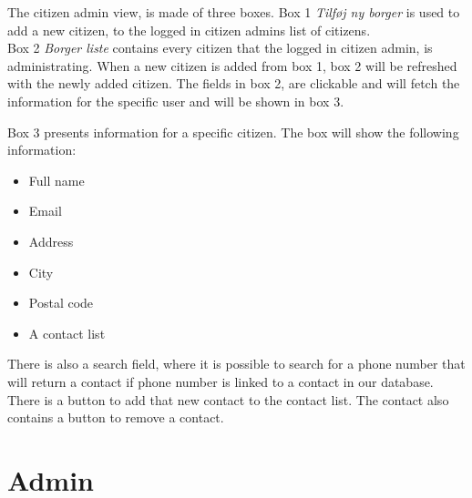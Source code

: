 The citizen admin view, is made of three boxes. Box 1 \textit{Tilføj ny borger} is used to add a new citizen, to the logged in citizen admins list of citizens.\\
Box 2 \textit{Borger liste} contains every citizen that the logged in citizen admin, is administrating. When a new citizen is added from box 1, box 2 will be refreshed with the newly added citizen. The fields in box 2, are clickable and will fetch the information for the specific user and will be shown in box 3.

Box 3 presents information for a specific citizen. The box will show the following information:
\begin{itemize}
    \item Full name
    \item Email
    \item Address
    \item City
    \item Postal code
    \item A contact list
\end{itemize}

There is also a search field, where it is possible to search for a phone number that will return a contact if phone number is linked to a contact in our database. There is a button to add that new contact to the contact list. The contact also contains a button to remove a contact. 



\section{Admin}

